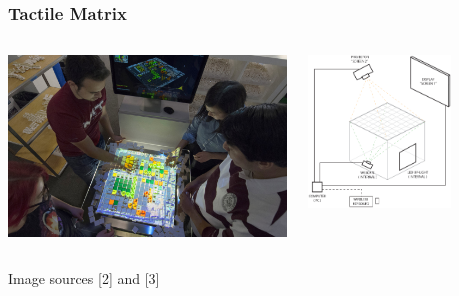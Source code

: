 \documentclass[czech,xcolor={table}]{beamer}
\begin{document}
	\begin{frame}
		\frametitle{Tactile Matrix}
		\begin{columns}
			\begin{column}{0.6\textwidth}
				\begin{center}
					\includegraphics[width=1\textwidth]{imgs/tactile.jpg}
				\end{center}
			\end{column}
			\begin{column}{0.45\textwidth}
				\begin{center}
					\includegraphics[width=0.7\textwidth]{imgs/tactilematrixelectronics.png}
				\end{center}
			\end{column}
		\end{columns}	
		\vspace{1em}
		\tiny Image sources [2] and [3]
	\end{frame}
\end{document}
